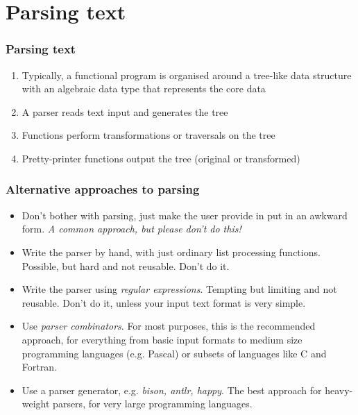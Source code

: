 \documentclass{beamer}
\begin{document}
\section{Parsing text}
\begin{frame}[fragile]
\frametitle{Parsing text}

\begin{enumerate}
\item Typically, a functional program is organised around a tree-like data structure with an algebraic data type that represents the core data
\item A parser reads text input and generates the tree
\item Functions perform transformations or traversals on the tree
\item Pretty-printer functions output the tree (original or transformed)
\end{enumerate}
\end{frame}


\begin{frame}[fragile]
\frametitle{Alternative approaches to parsing}

\begin{itemize}
\item Don't bother with parsing, just make the user provide in put
  in an awkward form.  \emph{A common approach, but please don't do
    this!}
\item Write the parser by hand, with just ordinary list processing
  functions. Possible, but hard and not reusable. Don't do it.
\item Write the parser using \emph{regular expressions}. Tempting but limiting and not reusable. Don't do it, unless your input text format is very simple.  
\item Use \emph{parser combinators}.  For most
  purposes, this is the recommended approach, for everything from
  basic input formats to medium size programming languages   (e.g. Pascal) or subsets of languages like C and Fortran.
\item Use a parser generator, e.g. \emph{bison, antlr, happy}.  The best approach
  for heavy-weight parsers, for very large programming languages.
\end{itemize}
\end{frame}
\end{document}
